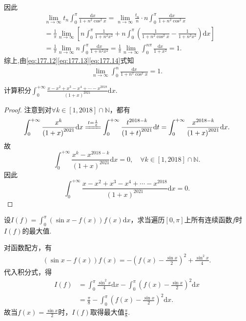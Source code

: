 \documentclass[../../main.tex]{subfiles}
\begin{document}
\begin{solution}
\begin{align*}
\end{align*}
因此
\begin{align}
&\lim\limits_{n\rightarrow \infty}t_n\int_0^{\pi}{\frac{\mathrm{d}x}{1+n^2\cos ^2x}}=\lim\limits_{n\rightarrow \infty}\frac{t_n}{n}\cdot n\int_0^{\pi}{\frac{\mathrm{d}x}{1+n^2\cos ^2x}} \nonumber \\
&=\frac{1}{\pi}\lim\limits_{n\rightarrow \infty}\left[ n\int_0^{\pi}{\frac{1}{1+n^2x^2}}+n\int_0^{\pi}{\left( \frac{1}{1+n^2\cos ^2x}-\frac{1}{1+n^2x^2} \right) \mathrm{d}x} \right] \nonumber \\
&=\frac{1}{\pi}\lim\limits_{n\rightarrow \infty}n\int_0^{\pi}{\frac{\mathrm{d}x}{1+n^2x^2}}=\frac{1}{\pi}\lim\limits_{n\rightarrow \infty}\int_0^{n\pi}{\frac{\mathrm{d}x}{1+x^2}}=1. \label{eq:177.14}
\end{align}
综上,由\eqref{eq:177.12}\eqref{eq:177.13}\eqref{eq:177.14}式知
\begin{align*}
\lim_{n\rightarrow \infty} \int_0^n{\frac{\mathrm{d}x}{1+n^2\cos ^2x}}=1.
\end{align*}
\end{solution}

\begin{example}
计算积分$\int_{0}^{+\infty} \frac{x - x^2 + x^3 - x^4 + \cdots - x^{2018}}{(1 + x)^{2021}} \mathrm{d}x$.
\end{example}
\begin{proof}
注意到对$\forall k\in \left[ 1,2018 \right] \cap \mathbb{N}$，都有
$$\int_0^{+\infty}{\frac{x^k}{\left( 1+x \right) ^{2021}}\mathrm{d}x}\xlongequal{t=\frac{1}{x}}\int_0^{+\infty}{\frac{t^{2018-k}}{\left( 1+t \right) ^{2021}}\mathrm{d}t}=\int_0^{+\infty}{\frac{x^{2018-k}}{\left( 1+x \right) ^{2021}}\mathrm{d}x}.$$
故
$$\int_0^{+\infty}{\frac{x^k-x^{2018-k}}{\left( 1+x \right) ^{2021}}\mathrm{d}x}=0,\quad \forall k\in \left[ 1,2018 \right] \cap \mathbb{N} .$$
因此
$$\int_0^{+\infty}{\frac{x-x^2+x^3-x^4+\cdots -x^{2018}}{\left( 1+x \right) ^{2021}}\mathrm{d}x}=0.$$
\end{proof}

\begin{example}
设$I(f) = \int_{0}^{\pi} (\sin x - f(x))f(x) \mathrm{d}x$，求当遍历$[0, \pi]$上所有连续函数$f$时$I(f)$的最大值.
\end{example}
\begin{solution}
对函数配方，有
\begin{align*}
(\sin x - f(x))f(x) = -\left(f(x) - \frac{\sin x}{2}\right)^2 + \frac{\sin^2 x}{4}.
\end{align*}
代入积分式，得
\begin{align*}
I(f) &= \int_{0}^{\pi} \frac{\sin^2 x}{4} \mathrm{d}x - \int_{0}^{\pi} \left(f(x) - \frac{\sin x}{2}\right)^2 \mathrm{d}x \\
&= \frac{\pi}{8} - \int_{0}^{\pi} \left(f(x) - \frac{\sin x}{2}\right)^2 \mathrm{d}x.
\end{align*}
故当\(f(x) = \frac{\sin x}{2}\)时，\(I(f)\)取得最大值\(\frac{\pi}{8}\).
\end{solution}
\end{document}

